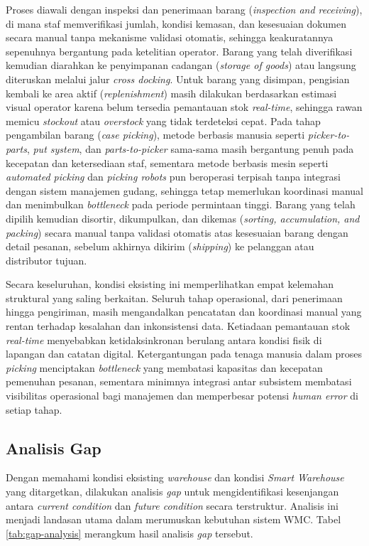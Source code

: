 Proses diawali dengan inspeksi dan penerimaan barang (\textit{inspection and receiving}), di mana staf memverifikasi jumlah, kondisi kemasan, dan kesesuaian dokumen secara manual tanpa mekanisme validasi otomatis, sehingga keakuratannya sepenuhnya bergantung pada ketelitian operator. Barang yang telah diverifikasi kemudian diarahkan ke penyimpanan cadangan (\textit{storage of goods}) atau langsung diteruskan melalui jalur \textit{cross docking}. Untuk barang yang disimpan, pengisian kembali ke area aktif (\textit{replenishment}) masih dilakukan berdasarkan estimasi visual operator karena belum tersedia pemantauan stok \textit{real-time}, sehingga rawan memicu \textit{stockout} atau \textit{overstock} yang tidak terdeteksi cepat. Pada tahap pengambilan barang (\textit{case picking}), metode berbasis manusia seperti \textit{picker-to-parts}, \textit{put system}, dan \textit{parts-to-picker} sama-sama masih bergantung penuh pada kecepatan dan ketersediaan staf, sementara metode berbasis mesin seperti \textit{automated picking} dan \textit{picking robots} pun beroperasi terpisah tanpa integrasi dengan sistem manajemen gudang, sehingga tetap memerlukan koordinasi manual dan menimbulkan \textit{bottleneck} pada periode permintaan tinggi. Barang yang telah dipilih kemudian disortir, dikumpulkan, dan dikemas (\textit{sorting, accumulation, and packing}) secara manual tanpa validasi otomatis atas kesesuaian barang dengan detail pesanan, sebelum akhirnya dikirim (\textit{shipping}) ke pelanggan atau distributor tujuan.

Secara keseluruhan, kondisi eksisting ini memperlihatkan empat kelemahan struktural yang saling berkaitan. Seluruh tahap operasional, dari penerimaan hingga pengiriman, masih mengandalkan pencatatan dan koordinasi manual yang rentan terhadap kesalahan dan inkonsistensi data. Ketiadaan pemantauan stok \textit{real-time} menyebabkan ketidaksinkronan berulang antara kondisi fisik di lapangan dan catatan digital. Ketergantungan pada tenaga manusia dalam proses \textit{picking} menciptakan \textit{bottleneck} yang membatasi kapasitas dan kecepatan pemenuhan pesanan, sementara minimnya integrasi antar subsistem membatasi visibilitas operasional bagi manajemen dan memperbesar potensi \textit{human error} di setiap tahap.

\subsection{Analisis Gap}
Dengan memahami kondisi eksisting \textit{warehouse} dan kondisi \textit{Smart Warehouse} yang ditargetkan, dilakukan analisis \textit{gap} untuk mengidentifikasi kesenjangan antara \textit{current condition} dan \textit{future condition} secara terstruktur. Analisis ini menjadi landasan utama dalam merumuskan kebutuhan sistem WMC. Tabel \ref{tab:gap-analysis} merangkum hasil analisis \textit{gap} tersebut.

